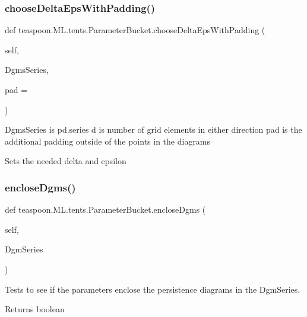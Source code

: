 \subsubsection{\texorpdfstring{choose\+Delta\+Eps\+With\+Padding()}{chooseDeltaEpsWithPadding()}}
{\footnotesize\ttfamily def teaspoon.\+M\+L.\+tents.\+Parameter\+Bucket.\+choose\+Delta\+Eps\+With\+Padding (\begin{DoxyParamCaption}\item[{}]{self,  }\item[{}]{Dgms\+Series,  }\item[{}]{pad = {} }\end{DoxyParamCaption})}

\begin{DoxyVerb}DgmsSeries is pd.series
d is number of grid elements in either direction
pad is the additional padding outside of the points in the diagrams

Sets the needed delta and epsilon\end{DoxyVerb}
 \mbox{\label{classteaspoon_1_1_m_l_1_1tents_1_1_parameter_bucket_afbc1ce46c67e2a86a72d93cdcba558ea}}
\subsubsection{\texorpdfstring{enclose\+Dgms()}{encloseDgms()}}
{\footnotesize\ttfamily def teaspoon.\+M\+L.\+tents.\+Parameter\+Bucket.\+enclose\+Dgms (\begin{DoxyParamCaption}\item[{}]{self,  }\item[{}]{Dgm\+Series }\end{DoxyParamCaption})}



Tests to see if the parameters enclose the persistence diagrams in the Dgm\+Series.

\begin{DoxyReturn}{Returns}
boolean
\end{DoxyReturn}
\mbox{\label{classteaspoon_1_1_m_l_1_1tents_1_1_parameter_bucket_a3fc98af840bf6f0f9f552e2e2f664fe8}}
